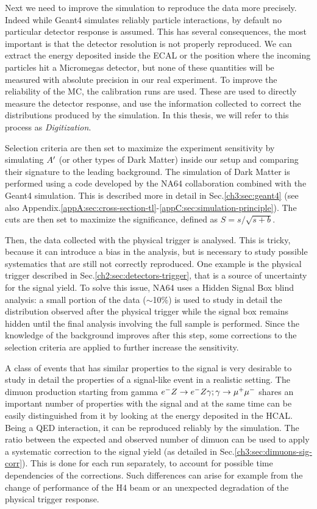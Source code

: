 Next we need to improve the simulation to reproduce the data more precisely. Indeed while Geant4 simulates reliably particle interactions, by default no particular detector response is assumed. This has several consequences, the most important is that the detector resolution is not properly reproduced. We can extract the energy deposited inside the ECAL or the position where the incoming particles hit a Micromegas detector, but none of these quantities will be measured with absolute precision in our real experiment. To improve the reliability of the MC, the calibration runs are used. These are used to directly measure the detector response, and use the information collected to correct the distributions produced by the simulation. In this thesis, we will refer to this process as \textit{Digitization}.

Selection criteria are then set to maximize the experiment sensitivity by simulating $A'$ (or other types of Dark Matter) inside our setup and comparing their signature to the leading background. The simulation of Dark Matter is performed using a code developed by the NA64 collaboration combined with the Geant4 simulation. This is described more in detail in Sec.\ref{ch3:sec:geant4} (see also Appendix.\ref{appA:sec:cross-section-tl}-\ref{appC:sec:simulation-principle}). The cuts are then set to maximize the significance, defined as $S = s/\sqrt{s+b}$.

Then, the data collected with the physical trigger is analysed. This is tricky, because it can introduce a bias in the analysis, but is necessary to study possible systematics that are still not correctly reproduced. 
One example is the physical trigger described in Sec.\ref{ch2:sec:detectors-trigger}, that is a source of uncertainty for the signal yield. To solve this issue, NA64 uses a Hidden Signal Box blind analysis\cite{blind-analysis}: a small portion of the data ($\sim$10\%) is used to study in detail the distribution observed after the physical trigger while the signal box remains hidden until the final analysis involving the full sample is performed. Since the knowledge of the background improves after this step, some corrections to the selection criteria are applied to further increase the sensitivity.

A class of events that has similar properties to the signal is very desirable to study in detail the properties of a signal-like event in a realistic setting.  The dimuon production starting from gamma $e^- Z \to e^- Z \gamma; \gamma \to \mu^+ \mu^-$ shares an important number of properties with the signal and at the same time can be easily distinguished from it by looking at the energy deposited in the HCAL. Being a QED interaction, it can be reproduced reliably by the simulation. The ratio between the expected and observed number of dimuon can be used to apply a systematic correction to the signal yield (as detailed in Sec.\ref{ch3:sec:dimuons-sig-corr}). This is done for each run separately, to account for possible time dependencies of the corrections. Such differences can arise for example from the change of performance of the H4 beam or an unexpected degradation of the physical trigger response.

